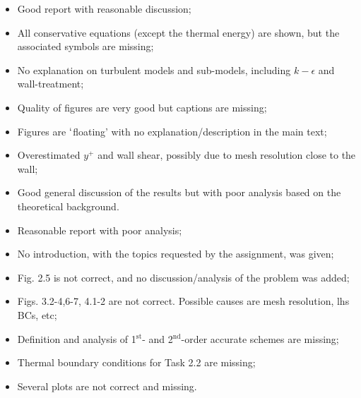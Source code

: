 \documentclass[14pt,twoside]{report}
\newcommand\blankpage{%
    \null
    \thispagestyle{empty}%
    \addtocounter{page}{-1}%
    \newpage}
\begin{document}
  \begin{itemize}
%
     \item Good report with reasonable discussion;
     \item All conservative equations (except the thermal energy) are shown, but the associated symbols are missing;
     \item No explanation on turbulent models and sub-models, including $k-\epsilon$ and wall-treatment;%
     \item Quality of figures are very good but captions are missing;
     \item Figures are $\lq$floating' with no explanation/description in the main text;
     \item Overestimated $y^{+}$ and wall shear, possibly due to mesh resolution close to the wall;
     \item Good general discussion of the results but with poor analysis based on the theoretical background.
%
  \end{itemize}%

\clearpage 





\bigskip


\medskip

  \begin{itemize}
%
     \item Reasonable report with poor analysis;
     \item No introduction, with the topics requested by the assignment, was given;
     \item Fig. 2.5 is not correct, and no discussion/analysis of the problem was added;
     \item Figs. 3.2-4,6-7, 4.1-2 are not correct. Possible causes are mesh resolution, lhs BCs, etc;
     \item Definition and analysis of 1$^{\text{st}}$- and 2$^{\text{nd}}$-order accurate schemes are missing;
     \item Thermal boundary conditions for Task 2.2 are missing;
     \item Several plots are not correct and missing.
%
  \end{itemize}%

\clearpage 
\end{document}
